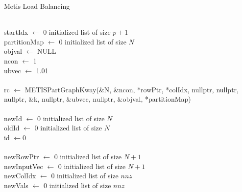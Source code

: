 \documentclass{article}
\begin{document}
    \begin{algorithm}[H]
        \caption{Metis Load Balancing}
        \SetAlgoVlined

        \phantom{a}\\
        startIdx \( \leftarrow \) 0 initialized list of size \( p + 1 \)\\
        partitionMap \( \leftarrow \) 0 initialized list of size \( N \)\\
        objval \( \leftarrow \) NULL\\
        ncon \( \leftarrow \) 1\\
        ubvec \( \leftarrow \) 1.01\\
        \phantom{a}\\

        rc \( \leftarrow \) METISPartGraphKway(\&N, \&ncon, *rowPtr, *colIdx, nullptr, nullptr, nullptr, \&k, nullptr, \&ubvec, nullptr, \&objval, *partitionMap)\\
        \phantom{a}\\
        newId \( \leftarrow \) 0 initialized list of size \( N \)\\
        oldId \( \leftarrow \) 0 initialized list of size \( N \)\\
        id \( \leftarrow \)0\\

        \phantom{a}\\
        newRowPtr \( \leftarrow \) 0 initialized list of size \( N+1 \)\\
        newInputVec \( \leftarrow \) 0 initialized list of size \( N+1 \)\\
        newColIdx \( \leftarrow \) 0 initialized list of size \( nnz \)\\
        newVals \( \leftarrow \) 0 initialized list of size \( nnz \)\\
        \phantom{a}\\


\end{algorithm}
\end{document}
